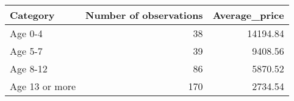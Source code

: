 \begin{tabular}{lrr}
  \toprule
Category & Number of observations & Average\_price \\ 
  \midrule
Age 0-4 &  38 & 14194.84 \\ 
  Age 5-7 &  39 & 9408.56 \\ 
  Age 8-12 &  86 & 5870.52 \\ 
  Age 13 or more & 170 & 2734.54 \\ 
   \bottomrule
\end{tabular}
